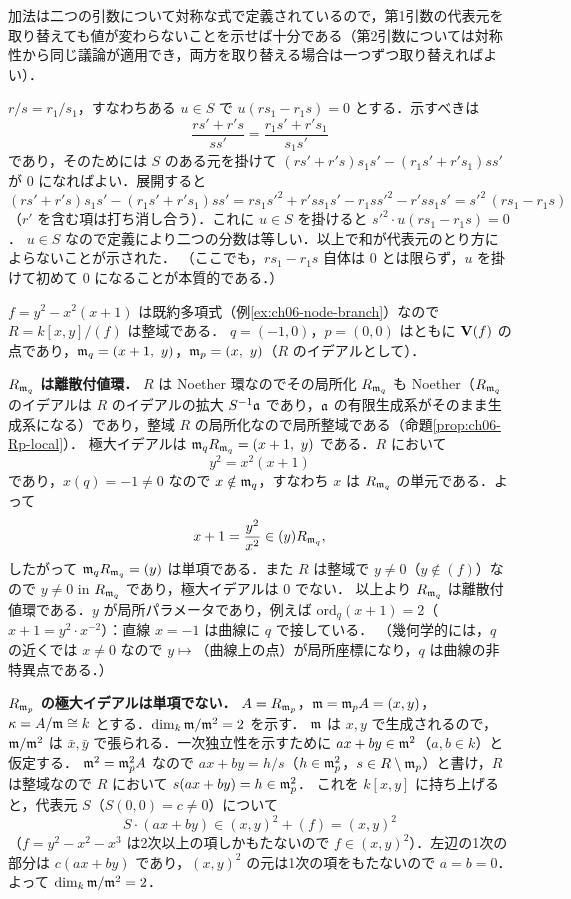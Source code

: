 加法は二つの引数について対称な式で定義されているので，第1引数の代表元を取り替えても値が変わらないことを示せば十分である（第2引数については対称性から同じ議論が適用でき，両方を取り替える場合は一つずつ取り替えればよい）．

$r/s=r_1/s_1$，すなわちある $u\in S$ で $u(rs_1-r_1s)=0$ とする．示すべきは
\[
  \frac{rs'+r's}{ss'}=\frac{r_1s'+r's_1}{s_1s'}
\]
であり，そのためには $S$ のある元を掛けて $(rs'+r's)s_1s'-(r_1s'+r's_1)ss'$ が $0$ になればよい．展開すると
\[
  (rs'+r's)s_1s'-(r_1s'+r's_1)ss'
  =rs_1s'^2+r'ss_1s'-r_1ss'^2-r'ss_1s'
  =s'^2\,(rs_1-r_1s)
\]
（$r'$ を含む項は打ち消し合う）．これに $u\in S$ を掛けると $s'^2\cdot u(rs_1-r_1s)=0$．
$u\in S$ なので定義により二つの分数は等しい．以上で和が代表元のとり方によらないことが示された．
（ここでも，$rs_1-r_1s$ 自体は $0$ とは限らず，$u$ を掛けて初めて $0$ になることが本質的である．）

$f=y^2-x^2(x+1)$ は既約多項式（例\ref{ex:ch06-node-branch}）なので $R=k[x,y]/(f)$ は整域である．
$q=(-1,0)$，$p=(0,0)$ はともに $\mathbf{V}(f)$ の点であり，$\mathfrak{m}_q=(x+1,\ y)$，$\m_p=(x,\ y)$（$R$ のイデアルとして）．

\textbf{$R_{\mathfrak{m}_q}$ は離散付値環．}
$R$ は Noether 環なのでその局所化 $R_{\mathfrak{m}_q}$ も Noether（$R_{\mathfrak{m}_q}$ のイデアルは $R$ のイデアルの拡大 $S^{-1}\mathfrak{a}$ であり，$\mathfrak{a}$ の有限生成系がそのまま生成系になる）であり，整域 $R$ の局所化なので局所整域である（命題\ref{prop:ch06-Rp-local}）．
極大イデアルは $\mathfrak{m}_qR_{\mathfrak{m}_q}=(x+1,\ y)$ である．$R$ において
\[
  y^2=x^2(x+1)
\]
であり，$x(q)=-1\ne0$ なので $x\notin\mathfrak{m}_q$，すなわち $x$ は $R_{\mathfrak{m}_q}$ の単元である．よって
\[
  x+1=\frac{y^2}{x^2}\in(y)R_{\mathfrak{m}_q},
\]
したがって $\mathfrak{m}_qR_{\mathfrak{m}_q}=(y)$ は単項である．また $R$ は整域で $y\ne0$（$y\notin(f)$）なので $y\ne0$ in $R_{\mathfrak{m}_q}$ であり，極大イデアルは $0$ でない．
以上より $R_{\mathfrak{m}_q}$ は離散付値環である．$y$ が局所パラメータであり，例えば $\mathrm{ord}_q(x+1)=2$（$x+1=y^2\cdot x^{-2}$）：直線 $x=-1$ は曲線に $q$ で接している．
（幾何学的には，$q$ の近くでは $x\ne0$ なので $y\mapsto$（曲線上の点）が局所座標になり，$q$ は曲線の非特異点である．）

\textbf{$R_{\mathfrak{m}_p}$ の極大イデアルは単項でない．}
$A=R_{\mathfrak{m}_p}$，$\mathfrak{m}=\mathfrak{m}_pA=(x,y)$，$\kappa=A/\mathfrak{m}\cong k$ とする．$\dim_k\mathfrak{m}/\mathfrak{m}^2=2$ を示す．
$\mathfrak{m}$ は $x,y$ で生成されるので，$\mathfrak{m}/\mathfrak{m}^2$ は $\bar x,\bar y$ で張られる．一次独立性を示すために $ax+by\in\mathfrak{m}^2$（$a,b\in k$）と仮定する．
$\mathfrak{m}^2=\mathfrak{m}_p^2A$ なので $ax+by=h/s$（$h\in\mathfrak{m}_p^2$，$s\in R\setminus\mathfrak{m}_p$）と書け，$R$ は整域なので $R$ において $s(ax+by)=h\in\mathfrak{m}_p^2$．
これを $k[x,y]$ に持ち上げると，代表元 $S$（$S(0,0)=c\ne0$）について
\[
  S\cdot(ax+by)\in(x,y)^2+(f)=(x,y)^2
\]
（$f=y^2-x^2-x^3$ は2次以上の項しかもたないので $f\in(x,y)^2$）．左辺の1次の部分は $c(ax+by)$ であり，$(x,y)^2$ の元は1次の項をもたないので $a=b=0$．
よって $\dim_k\mathfrak{m}/\mathfrak{m}^2=2$．


